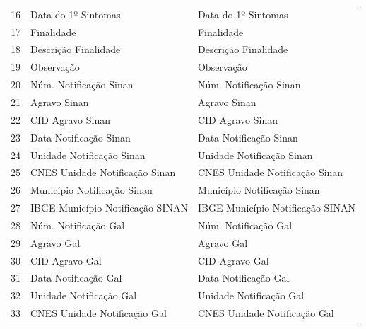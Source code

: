 \begin{table}
\begin{tabular}{lll}
\rowcolor[rgb]{0.753,0.753,0.753} 16 & Data do 1º Sintomas              & Data do 1º Sintomas               \\
17                                   & Finalidade                       & Finalidade                        \\
18                                   & Descrição Finalidade             & Descrição Finalidade              \\
19                                   & Observação                       & Observação                        \\
20                                   & Núm. Notificação Sinan           & Núm. Notificação Sinan            \\
21                                   & Agravo Sinan                     & Agravo Sinan                      \\
22                                   & CID Agravo Sinan                 & CID Agravo Sinan                  \\
23                                   & Data Notificação Sinan           & Data Notificação Sinan            \\
24                                   & Unidade Notificação Sinan        & Unidade Notificação Sinan         \\
25                                   & CNES Unidade Notificação Sinan   & CNES Unidade Notificação Sinan    \\
26                                   & Município Notificação Sinan      & Município Notificação Sinan       \\
27                                   & IBGE Município Notificação SINAN & IBGE Município Notificação SINAN  \\
28                                   & Núm. Notificação Gal             & Núm. Notificação Gal              \\
29                                   & Agravo Gal                       & Agravo Gal                        \\
30                                   & CID Agravo Gal                   & CID Agravo Gal                    \\
31                                   & Data Notificação Gal             & Data Notificação Gal              \\
32                                   & Unidade Notificação Gal          & Unidade Notificação Gal           \\
33                                   & CNES Unidade Notificação Gal     & CNES Unidade Notificação Gal      \\

\end{tabular}
\end{table}
